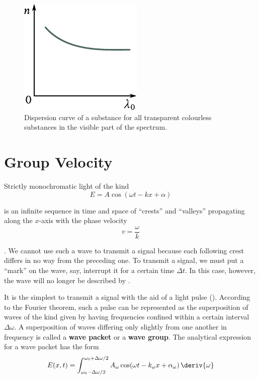 \begin{figure}[t]
	\begin{center}
		\includegraphics[scale=1]{figures/ch_20/fig_20_1.pdf}
        \caption[]{Dispersion curve of a substance for all transparent colourless substances in the visible part of the spectrum.}
		\label{fig:20_1}
	\end{center}
	\vspace{-0.8cm}
\end{figure}

\section{Group Velocity}\label{sec:20_2}

Strictly monochromatic light of the kind
\begin{equation}\label{eq:20_2}
	E = A \cos(\omega t - k x + \alpha)
\end{equation}

\noindent
is an infinite sequence in time and space of ``crests'' and ``valleys'' propagating along the $x$-axis with the phase velocity
\begin{equation}\label{eq:20_3}
	v = \frac{\omega}{k}
\end{equation}

.
We cannot use such a wave to transmit a signal because each following crest differs in no way from the preceding one.
To transmit a signal, we must put a ``mark'' on the wave, say, interrupt it for a certain time $\Delta t$.
In this case, however, the wave will no longer be described by .

It is the simplest to transmit a signal with the aid of a light pulse ().
According to the Fourier theorem, such a pulse can be represented as the superposition of waves of the kind given by  having frequencies confined within a certain interval $\Delta\omega$.
A superposition of waves differing only slightly from one another in frequency is called a \textbf{wave packet} or a \textbf{wave group}.
The analytical expression for a wave packet has the form
\begin{equation}\label{eq:20_4}
	E(x,t) = \int_{\omega_0-\Delta\omega/2}^{\omega_0+\Delta\omega/2} A_{\omega} \cos(\omega t - k_{\omega} x + \alpha_{\omega})\, \deriv{\omega}
\end{equation}

